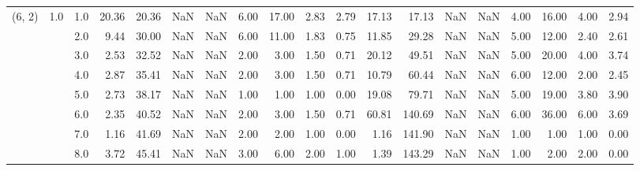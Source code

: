 \begin{tabular}{lllrrrrrrrrrrrrrrrr}
(6, 2) & 1.0 & 1.0  &     20.36 &      20.36 &               NaN &                NaN &  6.00 &  17.00 &             2.83 &                         2.79 &     17.13 &      17.13 &               NaN &                NaN & 4.00 &  16.00 &             4.00 &                         2.94 \\
       &     & 2.0  &      9.44 &      30.00 &               NaN &                NaN &  6.00 &  11.00 &             1.83 &                         0.75 &     11.85 &      29.28 &               NaN &                NaN & 5.00 &  12.00 &             2.40 &                         2.61 \\
       &     & 3.0  &      2.53 &      32.52 &               NaN &                NaN &  2.00 &   3.00 &             1.50 &                         0.71 &     20.12 &      49.51 &               NaN &                NaN & 5.00 &  20.00 &             4.00 &                         3.74 \\
       &     & 4.0  &      2.87 &      35.41 &               NaN &                NaN &  2.00 &   3.00 &             1.50 &                         0.71 &     10.79 &      60.44 &               NaN &                NaN & 6.00 &  12.00 &             2.00 &                         2.45 \\
       &     & 5.0  &      2.73 &      38.17 &               NaN &                NaN &  1.00 &   1.00 &             1.00 &                         0.00 &     19.08 &      79.71 &               NaN &                NaN & 5.00 &  19.00 &             3.80 &                         3.90 \\
       &     & 6.0  &      2.35 &      40.52 &               NaN &                NaN &  2.00 &   3.00 &             1.50 &                         0.71 &     60.81 &     140.69 &               NaN &                NaN & 6.00 &  36.00 &             6.00 &                         3.69 \\
       &     & 7.0  &      1.16 &      41.69 &               NaN &                NaN &  2.00 &   2.00 &             1.00 &                         0.00 &      1.16 &     141.90 &               NaN &                NaN & 1.00 &   1.00 &             1.00 &                         0.00 \\
       &     & 8.0  &      3.72 &      45.41 &               NaN &                NaN &  3.00 &   6.00 &             2.00 &                         1.00 &      1.39 &     143.29 &               NaN &                NaN & 1.00 &   2.00 &             2.00 &                         0.00 \\

\end{tabular}
